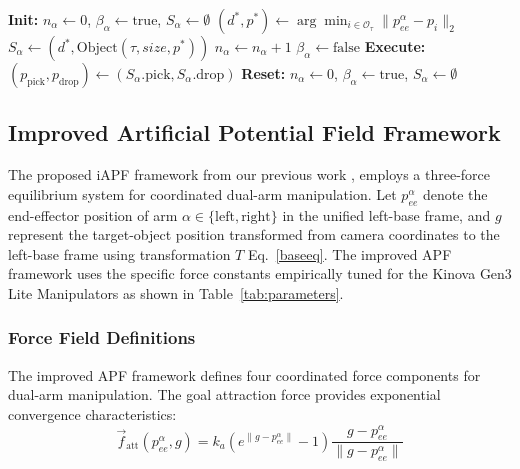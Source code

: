 \documentclass[pdflatex,sn-mathphys-num]{sn-jnl}%
\theoremstyle{thmstyleone}%
\theoremstyle{thmstylethree}%
\begin{document}
\begin{algorithm}
\caption{Temporal Proposal Window Mechanism}\label{algo2}
\begin{algorithmic}[1]
\State \textbf{Init:} $n_\alpha \leftarrow 0$, $\beta_\alpha \leftarrow \text{true}$, $S_\alpha \leftarrow \emptyset$
    \State $(d^*, p^*) \leftarrow \arg\min_{i \in \mathcal{O}_\tau} \|p^{\alpha}_{ee} - p_i\|_2$
                \State $S_\alpha \leftarrow (d^*, \text{Object}(\tau, size, p^*))$
            \EndIf
            \State $n_\alpha \leftarrow n_\alpha + 1$
        \Else
            \State $\beta_\alpha \leftarrow \text{false}$
        \EndIf
    \EndIf
\EndFor
{}
    \State \textbf{Execute:} $(p_{\text{pick}}, p_{\text{drop}}) \leftarrow (S_\alpha.\text{pick}, S_\alpha.\text{drop})$
    \State \textbf{Reset:} $n_\alpha \leftarrow 0$, $\beta_\alpha \leftarrow \text{true}$, $S_\alpha \leftarrow \emptyset$
\EndIf
\end{algorithmic}
\end{algorithm}
\subsection{Improved Artificial Potential Field Framework}
The proposed iAPF framework from our previous work \cite{iAPF}, employs a three-force equilibrium system for coordinated dual-arm manipulation. Let $p_{ee}^{\alpha}$ denote the end-effector position of arm $\alpha \in \{\text{left}, \text{right}\}$ in the unified left-base frame, and $g$ represent the target-object position transformed from camera coordinates to the left-base frame using transformation $T$ Eq.~\ref{baseeq}. The improved APF framework uses the specific force constants empirically tuned for the Kinova Gen3 Lite Manipulators as shown in Table~\ref{tab:parameters}.

\subsubsection{Force Field Definitions}
The improved APF framework defines four coordinated force components for dual-arm manipulation. The goal attraction force provides exponential convergence characteristics:
\begin{equation}
    \vec{f}_{\text{att}}(p_{ee}^{\alpha}, g) = 
k_a \left(e^{\lVert g - p_{ee}^{\alpha}\rVert} - 1\right) 
\frac{g - p_{ee}^{\alpha}}{\lVert g - p_{ee}^{\alpha}\rVert}    
\end{equation}
\end{document}
